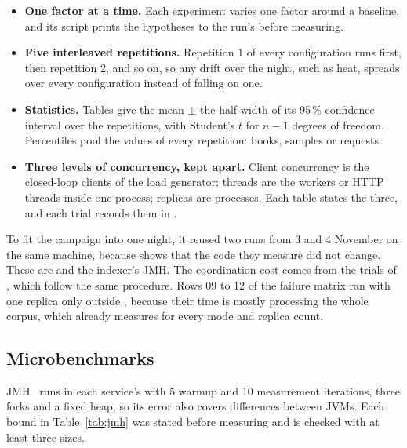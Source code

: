 \begin{itemize}
\item \textbf{One factor at a time.} Each experiment varies one factor around a baseline, and its script prints the
  hypotheses to the run's  before measuring.
\item \textbf{Five interleaved repetitions.} Repetition 1 of every configuration runs first, then repetition 2, and so
  on, so any drift over the night, such as heat, spreads over every configuration instead of falling on one.
\item \textbf{Statistics.} Tables give the mean $\pm$ the half-width of its 95\,\% confidence interval over the
  repetitions, with Student's $t$ for $n-1$ degrees of freedom. Percentiles pool the values of every repetition: books,
   samples or requests.
\item \textbf{Three levels of concurrency, kept apart.} Client concurrency is the closed-loop clients of the load
  generator; threads are the workers or HTTP threads inside one process; replicas are processes. Each table states the
  three, and each trial records them in .
\end{itemize}

To fit the campaign into one night, it reused two runs from 3 and 4 November on the same machine, because
 shows that the code they measure did not change. These are  and the indexer's JMH.
The coordination cost comes from the  trials of , which follow the same
procedure. Rows 09 to 12 of the failure matrix ran with one replica only outside , because their time is
mostly processing the whole corpus, which  already measures for every mode and replica
count.

\subsection{Microbenchmarks}

JMH~\cite{jmh} runs in each service's  with 5 warmup and 10 measurement iterations, three forks and a fixed
heap, so its error also covers differences between JVMs. Each bound in Table~\ref{tab:jmh} was stated before measuring
and is checked with at least three sizes.

